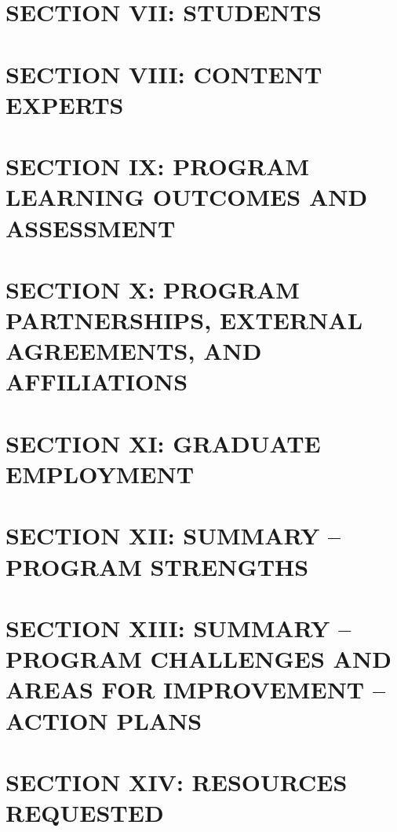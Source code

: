 \documentclass[12pt,a4paper,man,natbib,donotrepeattitle, book]{apa6}
\begin{document}
\section{SECTION VII: STUDENTS}
%

\section{SECTION VIII: CONTENT EXPERTS}
%

\section{SECTION IX: PROGRAM LEARNING OUTCOMES AND ASSESSMENT}
%

\section{SECTION X: PROGRAM PARTNERSHIPS, EXTERNAL AGREEMENTS, AND AFFILIATIONS}
%

\section{SECTION XI: GRADUATE EMPLOYMENT}
%

\section{SECTION XII: SUMMARY – PROGRAM STRENGTHS}
%

\section{SECTION XIII: SUMMARY – PROGRAM CHALLENGES AND AREAS FOR IMPROVEMENT – ACTION PLANS}
%

\section{SECTION XIV: RESOURCES REQUESTED}

\end{document}

